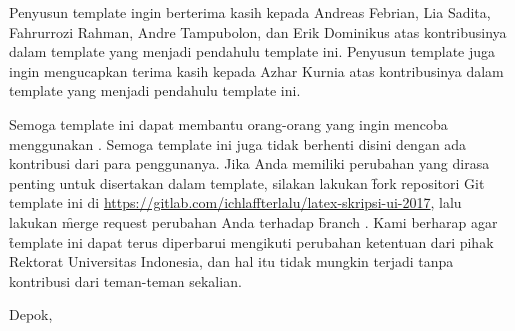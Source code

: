 Penyusun template ingin berterima kasih kepada Andreas Febrian, Lia Sadita, Fahrurrozi Rahman, Andre Tampubolon, dan Erik Dominikus atas kontribusinya dalam template yang menjadi pendahulu template ini.
Penyusun template juga ingin mengucapkan terima kasih kepada Azhar Kurnia atas kontribusinya dalam template yang menjadi pendahulu template ini.

Semoga template ini dapat membantu orang-orang yang ingin mencoba menggunakan \latex.
Semoga template ini juga tidak berhenti disini dengan ada kontribusi dari para penggunanya.
Jika Anda memiliki perubahan yang dirasa penting untuk disertakan dalam template, silakan lakukan \f{fork} repositori Git template ini di \url{https://gitlab.com/ichlaffterlalu/latex-skripsi-ui-2017}, lalu lakukan \f{merge request} perubahan Anda terhadap \f{branch} .
Kami berharap agar \f{template} ini dapat terus diperbarui mengikuti perubahan ketentuan dari pihak Rektorat Universitas Indonesia, dan hal itu tidak mungkin terjadi tanpa kontribusi dari teman-teman sekalian.

\vspace*{0.1cm}
\begin{flushright}
Depok, \tanggalSiapSidang\\[0.1cm]
\vspace*{1cm}
\penulis

\end{flushright}
